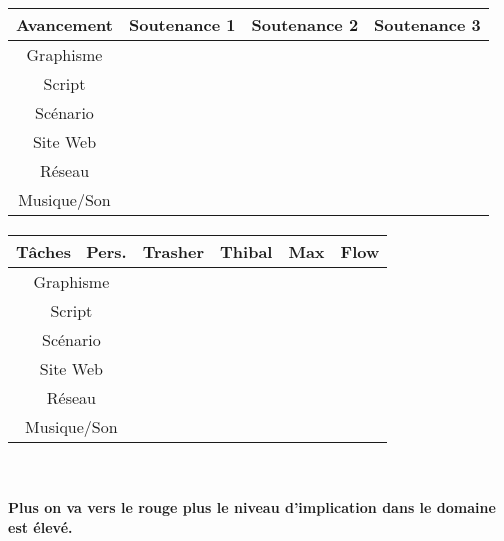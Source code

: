 \documentclass[12pt,a4paper]{article}
\begin{document}
\paragraph{}
\begin{center}
\begin{tabular}{|c|c|c|c|}
\hline 
\rowcolor{cyan} Avancement & Soutenance 1 & Soutenance 2 & Soutenance 3 \\ 
\hline 
\cellcolor{lightgray}Graphisme & \cellcolor{yellow} & \cellcolor{yellow} & \cellcolor{orange} \\ 
\hline 
\cellcolor{lightgray}Script & \cellcolor{yellow} &  \cellcolor{orange} & \cellcolor{red}  \\ 
\hline 
\cellcolor{lightgray}Scénario & \cellcolor{orange} &  \cellcolor{orange} &  \cellcolor{red} \\ 
\hline 
\cellcolor{lightgray}Site Web & \cellcolor{yellow} &  \cellcolor{orange} & \cellcolor{red}  \\ 
\hline
\cellcolor{lightgray}Réseau & \cellcolor{yellow} & \cellcolor{yellow} & \cellcolor{red} \\ 
\hline 
\cellcolor{lightgray}Musique/Son &  & \cellcolor{yellow} &  \cellcolor{orange}  \\ 
\hline 
\end{tabular}
\paragraph{}
\begin{tabular}{|c|c|c|c|c|}
 \hline 
 \rowcolor{cyan}Tâches \ Pers. & Trasher & Thibal & Max & Flow \\ 
 \hline 
 \cellcolor{lightgray}Graphisme & \cellcolor{red} &  &  & \cellcolor{yellow} \\ 
 \hline 
 \cellcolor{lightgray}Script &  & \cellcolor{yellow} & \cellcolor{red} & \cellcolor{yellow} \\ 
 \hline 
 \cellcolor{lightgray}Scénario & \cellcolor{yellow} & \cellcolor{yellow} & \cellcolor{yellow} & \cellcolor{yellow} \\ 
 \hline 
 \cellcolor{lightgray}Site Web &  & \cellcolor{red} &  &  \\ 
 \hline 
 \cellcolor{lightgray} Réseau & \cellcolor{orange} &  & \cellcolor{yellow} & \cellcolor{orange} \\ 
 \hline 
 \cellcolor{lightgray}Musique/Son &  & \cellcolor{yellow} &  & \cellcolor{yellow} \\ 
 \hline 
 \end{tabular}
 \
\paragraph{Plus on va vers le rouge plus le niveau d'implication dans le domaine est élevé.} 
\paragraph{}
 \begin{tabular}{|c|c|c|c|}
 \hline 
\cellcolor{white} & \cellcolor{yellow} & \cellcolor{orange} & \cellcolor{red} \\ 
 \hline 
 \end{tabular}

\end{center}
\newpage
\end{document}

